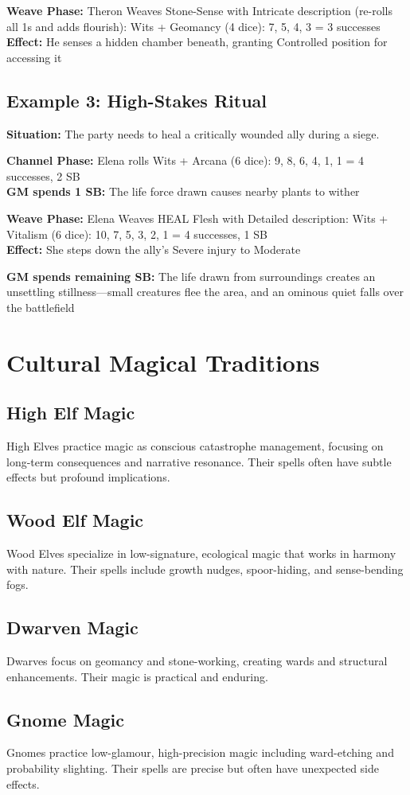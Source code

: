 \documentclass[11pt]{report}
\begin{document}
\textbf{Weave Phase:} Theron Weaves Stone-Sense with Intricate description (re-rolls all 1s and adds flourish): Wits + Geomancy (4 dice): 7, 5, 4, 3 = 3 successes\\
\textbf{Effect:} He senses a hidden chamber beneath, granting Controlled position for accessing it

\subsection{Example 3: High-Stakes Ritual}
\textbf{Situation:} The party needs to heal a critically wounded ally during a siege.

\textbf{Channel Phase:} Elena rolls Wits + Arcana (6 dice): 9, 8, 6, 4, 1, 1 = 4 successes, 2 SB\\
\textbf{GM spends 1 SB:} The life force drawn causes nearby plants to wither

\textbf{Weave Phase:} Elena Weaves HEAL Flesh with Detailed description: Wits + Vitalism (6 dice): 10, 7, 5, 3, 2, 1 = 4 successes, 1 SB\\
\textbf{Effect:} She steps down the ally's Severe injury to Moderate

\textbf{GM spends remaining SB:} The life drawn from surroundings creates an unsettling stillness---small creatures flee the area, and an ominous quiet falls over the battlefield

\section{Cultural Magical Traditions}

\subsection{High Elf Magic}
High Elves practice magic as conscious catastrophe management, focusing on long-term consequences and narrative resonance. Their spells often have subtle effects but profound implications.

\subsection{Wood Elf Magic}
Wood Elves specialize in low-signature, ecological magic that works in harmony with nature. Their spells include growth nudges, spoor-hiding, and sense-bending fogs.

\subsection{Dwarven Magic}
Dwarves focus on geomancy and stone-working, creating wards and structural enhancements. Their magic is practical and enduring.

\subsection{Gnome Magic}
Gnomes practice low-glamour, high-precision magic including ward-etching and probability slighting. Their spells are precise but often have unexpected side effects.
\end{document}
